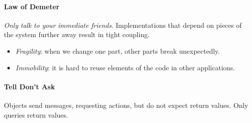 \documentclass[twocolumn,english]{article}
\begin{document}
\paragraph{Law of Demeter}

\emph{Only talk to your immediate friends}. Implementations that depend
on pieces of the system further away result in tight coupling.
\begin{itemize}
\item \emph{Fragility}: when we change one part, other parts break unexpectedly.
\item \emph{Immobility}: it is hard to reuse elements of the code in other
applications.
\end{itemize}

\paragraph{Tell Don't Ask}

Objects send messages, requesting actions, but do not expect return
values. Only queries return values.
\end{document}
